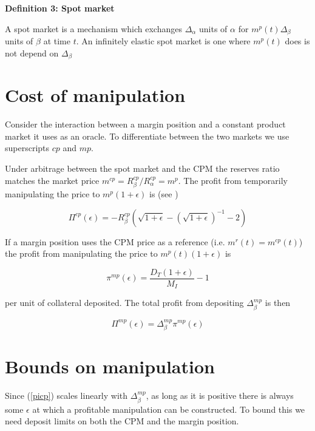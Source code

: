 \documentclass[12pt]{article}
\begin{document}
\textbf{Definition 3: Spot market}

A spot market is a mechanism which exchanges $\Delta_\alpha$ units of $\alpha$ for $m^p(t)\Delta_\beta$ units of $\beta$ at time $t$. An infinitely elastic spot market is one where $m^p(t)$ does is not depend on $\Delta_\beta$




\section{Cost of manipulation}

Consider the interaction between a margin position and a constant product market it uses as an oracle. To differentiate between the two markets we use superscripts $cp$ and $mp$.

Under arbitrage between the spot market and the CPM the reserves ratio matches the market price $m^{cp} = R_\beta^{cp}/R_\alpha^{cp} = m^p$. The profit from temporarily manipulating the price to $m^p(1+\epsilon)$ is (see \cite{ang20}) 

\begin{equation}
\label{Picp}
\Pi^{cp}(\epsilon) =  -R_\beta^{cp} ( \sqrt{1+\epsilon}  - (\sqrt{1+\epsilon})^{-1}-2) 
\end{equation}

If a margin position uses the CPM price as a reference (i.e. $m^r(t) = m^{cp}(t)$) the profit from manipulating the price to $m^p(t)(1+\epsilon)$ is

\begin{equation}
\label{pimp}
\pi^{mp}(\epsilon) = \frac{D_T(1+\epsilon)}{M_I}-1
\end{equation}


per unit of collateral deposited. The total profit from depositing $\Delta_\beta^{mp}$ is then

\begin{equation}
\label{picp}
\Pi^{mp}(\epsilon) = \Delta_\beta^{mp} \pi^{mp}(\epsilon)  
\end{equation}


\section{Bounds on manipulation}

Since (\ref{picp}) scales linearly with $\Delta_\beta^{mp}$, as long as it is positive there is always some $\epsilon$ at which a profitable manipulation can be constructed. To bound this we need deposit limits on both the CPM and the margin position. 
\end{document}
